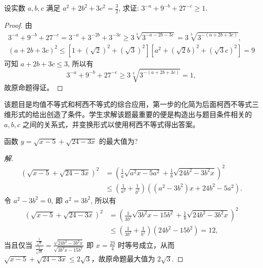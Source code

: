 \begin{example}
  \parencite{李梦2019数学竞赛中柯西不等式的教学研究} 设实数 $a, b, c$ 满足 $a^{2}+2 b^{2}+3 c^{2}=\frac{3}{2}$, 求证: $3^{-a}+9^{-b}+27^{-c} \geq 1$. 
\end{example}

\begin{proof}
  由 
  \begin{gather*}
    3^{-a}+9^{-b}+27^{-c}=3^{-a}+3^{-2 b}+3^{-3 c} \geq 3 \sqrt[3]{3^{-a-2 b-3 c}}=3 \sqrt[3]{3^{-(a+2 b+3 c)}},\\
    (a+2 b+3 c)^{2}\leq\left[1+(\sqrt{2})^{2}+(\sqrt{3})^{2}\right]\left[a^{2}+(\sqrt{2} b)^{2}+(\sqrt{3} c)^{2}\right]=9
  \end{gather*}
  可知 $a+2 b+3 c \leq 3$, 所以有 \[3^{-a}+9^{-b}+27^{-c} \geq 3 \sqrt[3]{3^{-(a+2 b+3 c)}}=1,\] 故原命题得证。
\end{proof}


\begin{analysis}
  该题目是均值不等式和柯西不等式的综合应用，第一步的化简为后面柯西不等式三维形式的给出创造了条件。学生求解该题最重要的便是构造出与题目条件相关的 $a, b, c$ 之间的关系式，并变换形式以使用柯西不等式得出答案。
\end{analysis}


\begin{example}
  \parencite{朱小扣2020聚焦柯西不等式在竞赛中四大运用} 函数 $y=\sqrt{x-5}+\sqrt{24-3 x}$ 的最大值为? 
\end{example}

\begin{proof}[解]
  \begin{align*}
    (\sqrt{x-5}+\sqrt{24-3 x})^{2}&=\left(\frac{1}{a} \sqrt{a^{2} x-5 a^{2}}+\frac{1}{b} \sqrt{24 b^{2}-3 b^{2} x}\right)^{2} \\ & \leq\left(\frac{1}{a^{2}}+\frac{1}{b^{2}}\right)\left(\left(a^{2}-3 b^{2}\right) x+24 b^{2}-5 a^{2}\right).
  \end{align*}
  令 $a^{2}-3 b^{2}=0$, 即 $a^{2}=3 b^{2}$, 所以有
  \begin{align*}
    (\sqrt{x-5}+\sqrt{24-3 x})^{2} &=\left(\frac{1}{3 b^{2}} \sqrt{3 b^{2} x-15 b^{2}}+\frac{1}{b} \sqrt{24 b^{2}-3 b^{2} x}\right)^{2} \\
    & \leq\left(\frac{1}{3 b^{2}}+\frac{1}{b^{2}}\right)\left(24 b^{2}-15 b^{2}\right)=12,
  \end{align*}
  当且仅当 $\frac{\frac{1}{\sqrt{b}}}{\frac{1}{\sqrt{3 b}}}=\frac{\sqrt{24 b^2 - 3 b^2 x}}{\sqrt{3 b^{2} x-15 b^{2}}}$ 即 $x=\frac{23}{4}$ 时等号成立，从而 $\sqrt{x-5}+\sqrt{24-3 x} \leq 2 \sqrt{3}$，故原命题最大值为 $2 \sqrt{3}$.
\end{proof}


